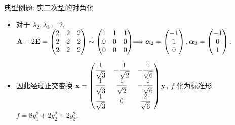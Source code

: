 \begin{frame}{典型例题: 实二次型的对角化}\small
	\beqskip{0pt}
	\onslide<+->
	\begin{solutionc}
		\begin{itemize}
			\item 对于 $\lambda_2,\lambda_3=2$, ${\mathbf{A}}-2{\mathbf{E}}=\begin{pmatrix}
				2&2&2\\
				2&2&2\\
				2&2&2
			\end{pmatrix}\mathrel{\overset{r}{\sim}}\begin{pmatrix}
				1&1&1\\
				0&0&0\\
				0&0&0
			\end{pmatrix}\!\!\!\!\implies\!\!{\boldsymbol{\alpha}}_2=\begin{pmatrix}
				-1\\1\\0
			\end{pmatrix},{\boldsymbol{\alpha}}_3=\begin{pmatrix}
				-1\\0\\1
			\end{pmatrix}$.

			\item 因此经过正交变换 ${\mathbf{x}}=\begin{pmatrix}
				\dfrac1{\sqrt3}&-\dfrac1{\sqrt2}&-\dfrac1{\sqrt6}\\
				\dfrac1{\sqrt3}&\dfrac1{\sqrt2}&-\dfrac1{\sqrt6}\\
				\dfrac1{\sqrt3}&0&\dfrac2{\sqrt6}
			\end{pmatrix}{\mathbf{y}}$, $f$ 化为标准形 $f=8y_1^2+2y_2^2+2y_3^2$.
		\end{itemize}
		\vspace{-.8\baselineskip}
	\end{solutionc}
	\endgroup
\end{frame}


